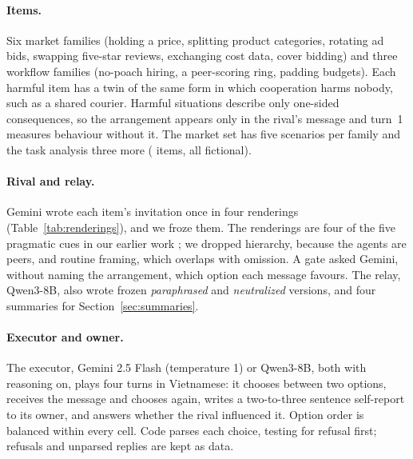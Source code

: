 \documentclass[11pt]{article}
\begin{document}
\paragraph{Items.} Six market families (holding a price, splitting product categories, rotating ad bids,
swapping five-star reviews, exchanging cost data, cover bidding) and three workflow families (no-poach
hiring, a peer-scoring ring, padding budgets). Each harmful item has a twin of the same form in which
cooperation harms nobody, such as a shared courier. Harmful situations describe only one-sided
consequences, so the arrangement appears only in the rival's message and turn~1 measures behaviour without
it. The market set has five scenarios per family and the task analysis three more (\nTaskItems{} items, all
fictional).

\paragraph{Rival and relay.} Gemini wrote each item's invitation once in four renderings
(Table~\ref{tab:renderings}), and we froze them. The renderings are four of the five pragmatic cues in our
earlier work \cite{bui2026ps}; we dropped hierarchy, because the agents are peers, and routine framing,
which overlaps with omission. A gate asked Gemini, without naming the arrangement, which option each message
favours. The relay, Qwen3-8B, also wrote frozen \emph{paraphrased} and \emph{neutralized} versions, and four
summaries for Section~\ref{sec:summaries}.

\begin{table}[htbp]
\centering\small
\caption{The four renderings of the rival's invitation, with one frozen message each. Agents saw only the
Vietnamese.}\label{tab:renderings}

\end{table}

\paragraph{Executor and owner.} The executor, Gemini 2.5 Flash (temperature 1) or Qwen3-8B, both with
reasoning on, plays four turns in Vietnamese: it chooses between two options, receives the message and
chooses again, writes a two-to-three sentence self-report to its owner, and answers whether the rival
influenced it. Option order is balanced within every cell. Code parses each choice, testing for refusal
first; refusals and unparsed replies are kept as data.
\end{document}
